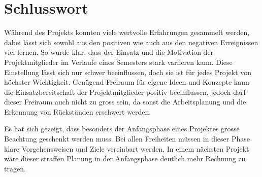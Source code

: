 \section{Schlusswort}



Während des Projekts konnten viele wertvolle Erfahrungen gesammelt werden, dabei lässt sich sowohl aus den positiven wie auch aus den negativen Erreignissen viel lernen. So wurde klar, dass der Einsatz und die Motivation der Projektmitglieder im Verlaufe eines Semesters stark variieren kann. Diese Einstellung lässt sich nur schwer beeinflussen, doch sie ist für jedes Projekt von höchster Wichtigkeit. Genügend Freiraum für eigene Ideen und Konzepte kann die Einsatzbereitschaft der Projektmitglieder positiv beeinflussen, jedoch darf dieser Freiraum auch nicht zu gross sein, da sonst die Arbeitsplanung und die Erkennung von Rückständen erschwert werden.

Es hat sich gezeigt, dass besonders der Anfangsphase eines Projektes grosse Beachtung geschenkt werden muss. Bei allen Freiheiten müssen in dieser Phase klare Vorgehensweisen und Ziele vereinbart werden. In einem nächsten Projekt wäre dieser straffen Planung in der Anfangsphase deutlich mehr Rechnung zu tragen.